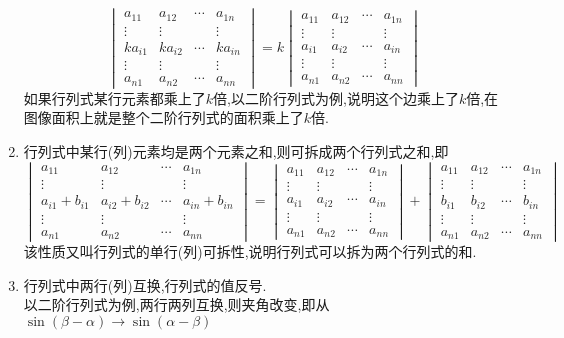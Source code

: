 \documentclass[8pt a4paper, oneside, UTF8]{ctexbook}
\begin{document}
\begin{sloppypar}
\begin{enumerate}
        $$\begin{vmatrix}a_{11}&a_{12}&\cdots&a_{1n}\\\vdots&\vdots&&\vdots\\ka_{i1}&ka_{i2}&\cdots&ka_{in}\\\vdots&\vdots&&\vdots\\a_{n1}&a_{n2}&\cdots&a_{nn}\end{vmatrix}=k\begin{vmatrix}a_{11}&a_{12}&\cdots&a_{1n}\\\vdots&\vdots&&\vdots\\a_{i1}&a_{i2}&\cdots&a_{in}\\\vdots&\vdots&&\vdots\\a_{n1}&a_{n2}&\cdots&a_{nn}\end{vmatrix}$$
        如果行列式某行元素都乘上了$k$倍,以二阶行列式为例,说明这个边乘上了$k$倍,在图像面积上就是整个二阶行列式的面积乘上了$k$倍.
        \item 行列式中某行(列)元素均是两个元素之和,则可拆成两个行列式之和,即
        $$\begin{vmatrix}a_{11}&a_{12}&\cdots&a_{1n}\\\vdots&\vdots&&\vdots\\a_{i1}+b_{i1}&a_{i2}+b_{i2}&\cdots&a_{in}+b_{in}\\\vdots&\vdots&&\vdots\\a_{n1}&a_{n2}&\cdots&a_{nn}\end{vmatrix}=\begin{vmatrix}a_{11}&a_{12}&\cdots&a_{1n}\\\vdots&\vdots&&\vdots\\a_{i1}&a_{i2}&\cdots&a_{in}\\\vdots&\vdots&&\vdots\\a_{n1}&a_{n2}&\cdots&a_{nn}\end{vmatrix}+\begin{vmatrix}a_{11}&a_{12}&\cdots&a_{1n}\\\vdots&\vdots&&\vdots\\b_{i1}&b_{i2}&\cdots&b_{in}\\\vdots&\vdots&&\vdots\\a_{n1}&a_{n2}&\cdots&a_{nn}\end{vmatrix}$$
        该性质又叫行列式的单行(列)可拆性,说明行列式可以拆为两个行列式的和.
        \item 行列式中两行(列)互换,行列式的值反号.\\
        以二阶行列式为例,两行两列互换,则夹角改变,即从$\sin(\beta-\alpha) \rightarrow \sin(\alpha-\beta)$

\end{enumerate}
\end{sloppypar}
\end{document}
